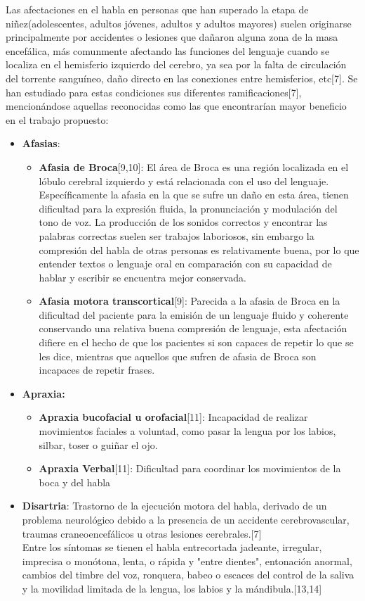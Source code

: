 \hfill \break
\justifying
Las afectaciones en el habla en personas que han superado la etapa de niñez(adolescentes, adultos jóvenes, adultos y adultos mayores) suelen originarse principalmente por accidentes o lesiones que dañaron alguna zona de la masa encefálica, más comunmente afectando las funciones del lenguaje cuando se localiza en el hemisferio izquierdo del cerebro, ya sea por la falta de circulación del torrente sanguíneo, daño directo en las conexiones entre hemisferios, etc[7]. Se han estudiado para estas condiciones sus diferentes ramificaciones[7], mencionándose aquellas reconocidas como las que encontrarían mayor beneficio en el trabajo propuesto:
\begin{itemize}
	\item \textbf{Afasias}:
		\begin{itemize}
			\item \textbf{Afasia de Broca}[9,10]: El área de Broca es una región localizada en el lóbulo cerebral izquierdo y está relacionada con el uso del lenguaje. Específicamente la afasia en la que se sufre un daño en esta área, tienen dificultad para la expresión fluida, la pronunciación y modulación del tono de voz. La producción de los sonidos correctos y encontrar las palabras correctas suelen ser trabajos laboriosos, sin embargo la compresión del habla de otras personas es relativamente buena, por lo que entender textos o lenguaje oral en comparación con su capacidad de hablar y escribir se encuentra mejor conservada.
			\item \textbf{Afasia motora transcortical}[9]: Parecida a la afasia de Broca en la dificultad del paciente para la emisión de un lenguaje fluido y coherente conservando una relativa buena compresión de lenguaje, esta afectación difiere en el hecho de que los pacientes si son capaces de repetir lo que se les dice, mientras que aquellos que sufren de afasia de Broca son incapaces de repetir frases.
		\end{itemize}
	\item \textbf{Apraxia:}
	\begin{itemize}
		\item \textbf{Apraxia bucofacial u orofacial}[11]: Incapacidad de realizar movimientos faciales a voluntad, como pasar la lengua por los labios, silbar, toser o guiñar el ojo.
		\item \textbf{Apraxia Verbal}[11]: Dificultad para coordinar los movimientos de la boca y del habla
	\end{itemize}
	\item \textbf{Disartria}: Trastorno de la ejecución motora del habla, derivado de un problema neurológico debido a la presencia de un accidente cerebrovascular, traumas craneoencefálicos u otras lesiones cerebrales.[7] \\ Entre los síntomas se tienen el habla entrecortada jadeante, irregular, imprecisa o monótona, lenta, o rápida y "entre dientes", entonación anormal, cambios del timbre del voz, ronquera, babeo o escaces del control de la saliva y la movilidad limitada de la lengua, los labios y la mándibula.[13,14]
\end{itemize}

